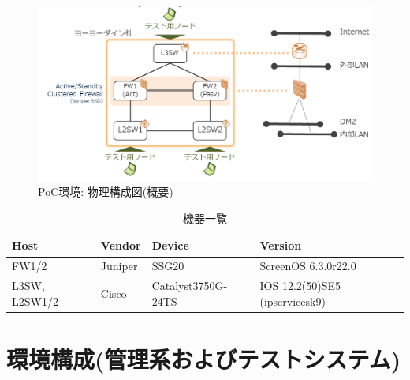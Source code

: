 

\begin{figure}[h]
 \centering
 \includegraphics[scale=0.55]{img/poc-env-physical.png}
 \caption{PoC環境: 物理構成図(概要)}
 \label{fig:poc-env-physical}
\end{figure}

\begin{table}[h]
 \centering
 \caption{機器一覧}
 \label{tbl:device-list}
 \begin{tabular}[t]{l|l|l|l}
  \hline
  Host & Vendor & Device & Version \\
  \hline
  \hline
  FW1/2 & Juniper & SSG20 & ScreenOS 6.3.0r22.0 \\ \hline
  L3SW, L2SW1/2 & Cisco & Catalyst3750G-24TS & IOS 12.2(50)SE5 (ipservicesk9) \\ \hline
 \end{tabular}
\end{table}


 \section{環境構成(管理系およびテストシステム)}
 \label{sec:mgmt-and-tester-nw}

